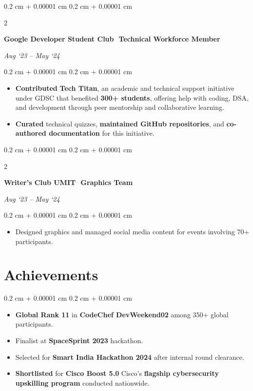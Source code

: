 \documentclass[10pt, a4]{article}
\newcommand{\pipe}{\,{\textbar}\,}
\newenvironment{highlights}{
    \begin{itemize}[
        topsep=0.10 cm,
        parsep=0.10 cm,
        partopsep=0pt,
        itemsep=0pt,
        leftmargin=0.4 cm + 10pt
    ]
}{
    \end{itemize}
} %
\newenvironment{highlightsforbulletentries}{
    \begin{itemize}[
        topsep=0.10 cm,
        parsep=0.10 cm,
        partopsep=0pt,
        itemsep=0pt,
        leftmargin=10pt
    ]
}{
    \end{itemize}
} %
\newenvironment{onecolentry}{
    \begin{adjustwidth}{
        0.2 cm + 0.00001 cm
    }{
        0.2 cm + 0.00001 cm
    }
}{
    \end{adjustwidth}
} %
\newenvironment{twocolentry}[2][]{
    \onecolentry
    \def\secondColumn{#2}
    \setcolumnwidth{\fill, 4.5 cm}
    \begin{paracol}{2}
}{
    \switchcolumn \raggedleft \secondColumn
    \end{paracol}
    \endonecolentry
} %
\begin{document}
        \vspace{0.2 cm}
        \begin{twocolentry}{\textit{Aug ‘23 – May ‘24}}
            \textbf{Google Developer Student Club \pipe Technical Workforce Member}
        \end{twocolentry}
        \vspace{0.10 cm}
        \begin{onecolentry}
            \begin{highlights}
                \item \textbf{Contributed} \textbf{Tech Titan}, an academic and technical support initiative under GDSC that benefited \textbf{300+ students}, offering help with coding, DSA, and development through peer mentorship and collaborative learning.

                \item \textbf{Curated} technical quizzes, \textbf{maintained GitHub repositories}, and \textbf{co-authored documentation} for this initiative.

            \end{highlights}
        \end{onecolentry}

        \vspace{0.2 cm}
        \begin{twocolentry}{\textit{Aug ‘23 – May ‘24}}
            \textbf{Writer’s Club UMIT \pipe Graphics Team}
        \end{twocolentry}
        \vspace{0.10 cm}
        \begin{onecolentry}
            \begin{highlights}
                \item Designed graphics and managed social media content for events involving 70+ participants.
            \end{highlights}
        \end{onecolentry}

    \section{Achievements}
        \begin{onecolentry}
            \begin{highlightsforbulletentries}
                \item \textbf{Global Rank 11} in \textbf{CodeChef DevWeekend02} among 350+ global participants.
                \item Finalist at \textbf{SpaceSprint 2023} hackathon.
                \item Selected for \textbf{Smart India Hackathon 2024} after internal round clearance.
                \item \textbf{Shortlisted} for \textbf{Cisco Boost 5.0} Cisco’s \textbf{flagship cybersecurity upskilling program} conducted nationwide.
            \end{highlightsforbulletentries}
        \end{onecolentry}
\end{document}

